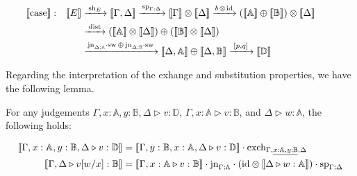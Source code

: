 \begin{align*}
    &\hspace{-20pt}\llbracket \text{case} \rrbracket : & [\![E]\!] & \xrightarrow{\hspace{2pt}\text{sh}_{E}\hspace{2pt}}   [\![\Gamma,\Delta ]\!]   \xrightarrow{\hspace{1pt}\text{sp}_{\Gamma;\Delta}\hspace{1pt}}  [\![\Gamma ]\!] \otimes [\![\Delta ]\!] \xrightarrow{ b \hspace{1pt} \otimes \hspace{1pt} \id} ([\![\mathbb{A} ]\!] \oplus[\![\mathbb{B} ]\!]) \otimes [\![\Delta ]\!]   \\
     & &  &\xrightarrow{\hspace{2pt}\dist\hspace{1pt}} \left([\![\mathbb{A} ]\!] \otimes [\![\Delta ]\!]\right) \oplus \left([\![\mathbb{B} ]\!] \otimes [\![\Delta ]\!]\right)  \\
     & & &  \xrightarrow{\hspace{1pt}\text{jn}_{\Delta;\typeA}\comp \sw \,\oplus  \, \text{jn}_{\Delta;\typeB}\comp \sw\hspace{1pt}} [\![ \Delta,\mathbb{A}]\!]\oplus [\![\Delta, \mathbb{B} ]\!]\xrightarrow{\hspace{2pt}[p,q]\hspace{2pt}} \llbracket \mathbb{D} \rrbracket \\
\end{align*} 


Regarding the interpretation of the exhange and substitution properties, we have the following lemma.

\begin{lemma} \label{lem:sub_exch}
  For any judgements $\Gamma, x: \mathbb{A}, y: \mathbb{B}, \Delta \triangleright v : \mathbb{D}$, $\Gamma, x: \mathbb{A} \triangleright v: \mathbb{B}$, and $\Delta \triangleright w: \mathbb{A}$, the following holds:
\end{lemma}
\vspace{-30pt}
\begin{equation*}
\begin{split}
  \llbracket \Gamma, x: \mathbb{A}, y: \mathbb{B}, \Delta \triangleright v : \mathbb{D} \rrbracket & = \llbracket \Gamma,  y: \mathbb{B}, x: \mathbb{A}, \Delta \triangleright v : \mathbb{D} \rrbracket \cdot \text{exch}_{\Gamma, \underline{x: \mathbb{A}, y: \mathbb{B}}, \Delta}\\
  \llbracket \Gamma,\Delta \triangleright v[w/x]: \mathbb{B} \rrbracket & = \llbracket \Gamma, x: \mathbb{A} \triangleright v: \mathbb{B} \rrbracket \cdot \text{jn}_{\Gamma;\mathbb{A}} \cdot (\mathrm{id} \otimes \llbracket \Delta \triangleright w: \mathbb{A} \rrbracket ) \cdot \text{sp}_{\Gamma; \Delta} 
\end{split}
\end{equation*}


